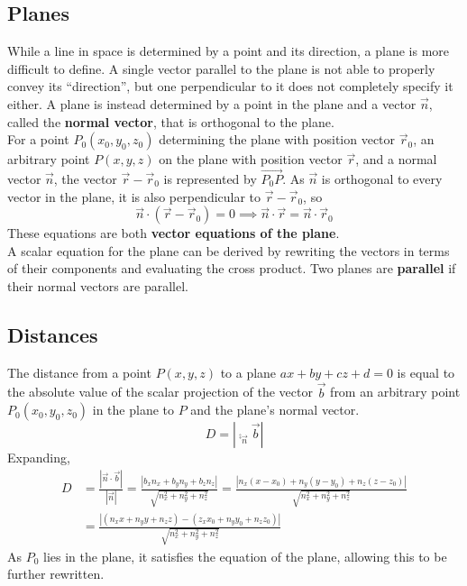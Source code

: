 \documentclass[../Calculus_\Roman{3}]{subfiles}
\begin{document}
				\subsection*{Planes}
					While a line in space is determined by a point and its direction, a plane is more difficult to define. A single vector parallel to the plane is not able to properly convey its \enquote{direction}, but one perpendicular to it does not completely specify it either. A plane is instead determined by a point in the plane and a vector $\vec{n}$, called the \textbf{normal vector}, that is orthogonal to the plane. \\
					For a point $P_0(x_0, y_0, z_0)$ determining the plane with position vector $\vec{r}_0$, an arbitrary point $P(x, y, z)$ on the plane with position vector $\vec{r}$, and a normal vector $\vec{n}$, the vector $\vec{r} - \vec{r}_0$ is represented by $\Vec{P_0P}$. As $\vec{n}$ is orthogonal to every vector in the plane, it is also perpendicular to $\vec{r} - \vec{r}_0$, so
						\[\vec{n} \cdot (\vec{r} - \vec{r}_0) = 0 \implies \vec{n}\cdot \vec{r} = \vec{n} \cdot \vec{r}_0\]
					These equations are both \textbf{vector equations of the plane}. \\
					A scalar equation for the plane can be derived by rewriting the vectors in terms of their components and evaluating the cross product.
					Two planes are \textbf{parallel} if their normal vectors are parallel.
				\subsection*{Distances}
					The distance from a point $P(x, y, z)$ to a plane $ax + by + cz + d = 0$ is equal to the absolute value of the scalar projection of the vector $\vec{b}$ from an arbitrary point $P_0(x_0, y_0, z_0)$ in the plane to $P$ and the plane's normal vector. \\
						\[D = |\comp_{\vec{n}}\vec{b}|\]
					Expanding, 
						\begin{align*}
							D &= \frac{|\vec{n} \cdot \vec{b}|}{|\vec{n}|}
									= \frac{|b_xn_x + b_yn_y + b_zn_z|}{\sqrt{n_x^2 + n_y^2 + n_z^2}}
									= \frac{|n_x(x - x_0) + n_y(y - y_0) + n_z(z - z_0)|}{\sqrt{n_x^2 + n_y^2 + n_z^2}} \\
								&= \frac{|(n_xx + n_yy + n_zz) - (z_xx_0 + n_yy_0 + n_zz_0)|}{\sqrt{n_x^2 + n_y^2 + n_z^2}}
						\end{align*}
					As $P_0$ lies in the plane, it satisfies the equation of the plane, allowing this to be further rewritten.
\end{document}
